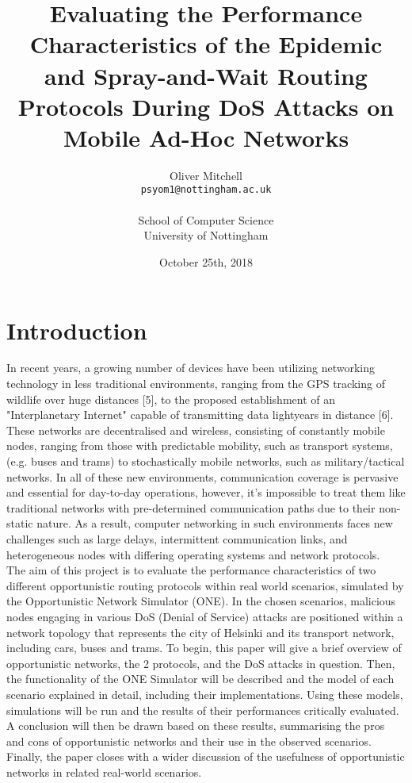\documentclass{article}
\title{Evaluating the Performance Characteristics of the Epidemic and Spray-and-Wait Routing Protocols During DoS Attacks on Mobile Ad-Hoc Networks }
\author{
  Oliver Mitchell\\
  \texttt{psyom1@nottingham.ac.uk}\\\\
  \textnormal{School of Computer Science}\\
  \textnormal{University of Nottingham}
}
\date{October 25th, 2018}
\begin{document}
\maketitle
 
\tableofcontents
\newpage

\section{Introduction}

In recent years, a growing number of devices have been utilizing networking technology in less traditional environments, ranging from the GPS tracking of wildlife over huge distances [5], to the proposed establishment of an "Interplanetary Internet" capable of transmitting data lightyears in distance [6]. These networks are decentralised and wireless, consisting of constantly mobile nodes, ranging from those with predictable mobility, such as transport systems, (e.g. buses and trams) to stochastically mobile networks, such as military/tactical networks. In all of these new environments, communication coverage is pervasive and essential for day-to-day operations, however, it's impossible to treat them like traditional networks with pre-determined communication paths due to their non-static nature. As a result, computer networking in such environments faces new challenges such as large delays, intermittent communication links, and heterogeneous nodes with differing operating systems and network protocols.\\

\noindent The aim of this project is to evaluate the performance characteristics of two different opportunistic routing protocols within real world scenarios, simulated by the Opportunistic Network Simulator (ONE). In the chosen scenarios, malicious nodes engaging in various DoS (Denial of Service) attacks are positioned within a network topology that represents the city of Helsinki and its transport network, including cars, buses and trams.
To begin, this paper will give a brief overview of opportunistic networks, the 2 protocols, and the DoS attacks in question. Then, the functionality of the ONE Simulator will be described and the model of each scenario explained in detail, including their implementations. Using these models, simulations will be run and the results of their performances critically evaluated. A conclusion will then be drawn based on these results, summarising the pros and cons of opportunistic networks and their use in the observed scenarios. Finally, the paper closes with a wider discussion of the usefulness of opportunistic networks in related real-world scenarios.
 
\end{document}
